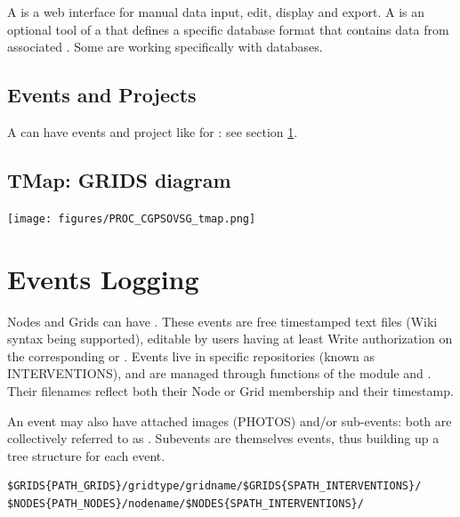 \label{forms}

A  is a web interface for manual data input, edit, display and export. A  is an optional tool of a  that defines a specific database format that contains data from associated . Some  are working specifically with  databases.

\subsection{Events and Projects}

A  can have events and project like for : see section \ref{events:logging}.

\subsection{TMap: GRIDS diagram}
\label{tmap}

\texttt{[image: figures/PROC\_CGPSOVSG\_tmap.png]}


\section{Events Logging}
\label{events:logging}

Nodes and Grids can have . These events are free timestamped text files (Wiki syntax being supported), editable by users having at least Write authorization on the corresponding  or . Events live in specific repositories (known as INTERVENTIONS), and are managed through functions of the  module and . Their filenames reflect both their Node or Grid membership and their timestamp. 

An event may also have attached images (PHOTOS) and/or sub-events: both are collectively referred to as . 
Subevents are themselves events, thus building up a tree structure for each event.

\begin{lstlisting}[title=Events base directories (interventions)]
$GRIDS{PATH_GRIDS}/gridtype/gridname/$GRIDS{SPATH_INTERVENTIONS}/
$NODES{PATH_NODES}/nodename/$NODES{SPATH_INTERVENTIONS}/
\end{lstlisting}

